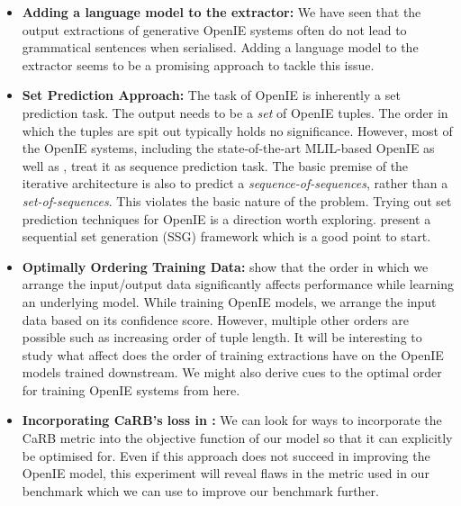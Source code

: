     \begin{itemize}
        \item \textbf{Adding a language model to the extractor:} We have seen that the output extractions of generative OpenIE systems often do not lead to grammatical sentences when serialised. Adding a language model to the extractor seems to be a promising approach to tackle this issue.
        
        \item \textbf{Set Prediction Approach:} The task of OpenIE is inherently a set prediction task. The output needs to be a \emph{set} of OpenIE tuples. The order in which the tuples are spit out typically holds no significance. However, most of the OpenIE systems, including the state-of-the-art MLIL-based OpenIE as well as \shortname, treat it as sequence prediction task. The basic premise of the iterative architecture is also to predict a \emph{sequence-of-sequences}, rather than a \emph{set-of-sequences}. This violates the basic nature of the problem. Trying out set prediction techniques for OpenIE is a direction worth exploring. \cite{gao&al19} present a sequential set generation (SSG) framework which is a good point to start.
        
        \item \textbf{Optimally Ordering Training Data:} \cite{vinyals&al16} show that the order in which we arrange the input/output data significantly affects performance while learning an underlying model. While training OpenIE models, we arrange the input data based on its confidence score. However, multiple other orders are possible such as increasing order of tuple length. It will be interesting to study what affect does the order of training extractions have on the OpenIE models trained downstream. We might also derive cues to the optimal order for training OpenIE systems from here.
        
        \item \textbf{Incorporating CaRB's loss in \mlilshortname:} We can look for ways to incorporate the CaRB metric into the objective function of our model so that it can explicitly be optimised for. Even if this approach does not succeed in improving the OpenIE model, this experiment will reveal flaws in the metric used in our benchmark which we can use to improve our benchmark further.
    \end{itemize}